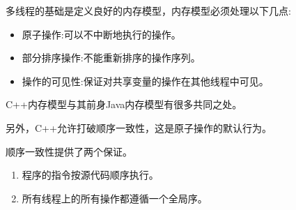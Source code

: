 多线程的基础是定义良好的内存模型，内存模型必须处理以下几点:

\begin{itemize}
\item 
原子操作:可以不中断地执行的操作。

\item 
部分排序操作:不能重新排序的操作序列。

\item 
操作的可见性:保证对共享变量的操作在其他线程中可见。
\end{itemize}

C++内存模型与其前身Java内存模型有很多共同之处。

另外，C++允许打破顺序一致性，这是原子操作的默认行为。

顺序一致性提供了两个保证。

\begin{enumerate}
\item 
程序的指令按源代码顺序执行。

\item 
所有线程上的所有操作都遵循一个全局序。
\end{enumerate}















































